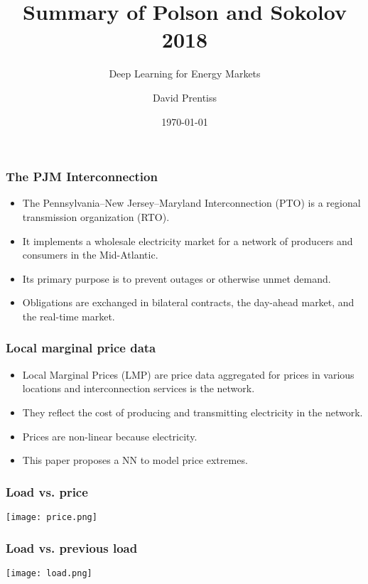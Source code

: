 \documentclass{beamer}
\begin{document}
\title{Summary of Polson and Sokolov 2018}
\subtitle{Deep Learning for Energy Markets}
\author{David Prentiss}
\date{\today}

\frame{\titlepage}

\begin{frame}
  \frametitle{The PJM Interconnection}
  \begin{itemize}
 \item The Pennsylvania--New Jersey--Maryland Interconnection (PTO) is a regional transmission organization (RTO).
    \item It implements a wholesale electricity market for a network of producers and consumers in the Mid-Atlantic.
      \item Its primary purpose is to prevent outages or otherwise unmet demand.
        \item Obligations are exchanged in bilateral contracts, the day-ahead market,
          and the real-time market.
  \end{itemize}
\end{frame}

\begin{frame}
  \frametitle{Local marginal price data}
  \begin{itemize}
  \item Local Marginal Prices (LMP) are price data aggregated for prices in various
  locations and interconnection services is the network.
  \item They reflect the cost of producing and transmitting electricity in the network.
    \item Prices are non-linear because electricity.
      \item This paper proposes a NN to model price extremes.
  \end{itemize}
\end{frame}

\begin{frame}
  \frametitle{Load vs. price}
  \texttt{[image: price.png]}
\end{frame}

\begin{frame}
  \frametitle{Load vs. previous load}
  \texttt{[image: load.png]}
\end{frame}
\end{document}
